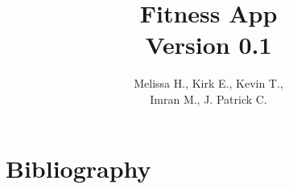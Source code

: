 \documentclass{article}
\title{Fitness App \\ \small{Version 0.1}}
\author{Melissa H., Kirk E., Kevin T., \\
Imran M., J. Patrick C.}
\begin{document}
\maketitle
\tableofcontents
\pagebreak







\section{Bibliography}
\end{document}
